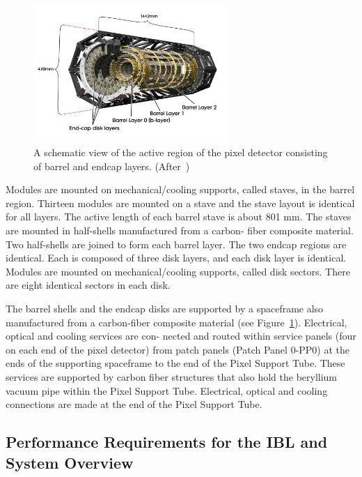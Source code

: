 \begin{figure}[!htpb]
\centering
\includegraphics[width=0.65\textwidth]{pixstruc.png}
\caption{\label{fig:pixstruc} A schematic view of the active region of the pixel detector consisting of barrel and endcap layers. (After~\cite{AtlasPixels})}
\end{figure}

Modules are mounted on mechanical/cooling supports, called staves, in the barrel region. Thirteen 
modules are mounted on a stave and the stave layout is identical for all layers. The active length of 
each barrel stave is about 801 mm. The staves are mounted in half-shells manufactured from a carbon-
fiber composite material. Two half-shells are joined to form each barrel layer.
The two endcap regions are identical. Each is composed of three disk layers, and each disk layer is 
identical. Modules are mounted on mechanical/cooling supports, called disk sectors. There are eight 
identical sectors in each disk.

The barrel shells and the endcap disks are supported by a spaceframe also manufactured from a 
carbon-fiber composite material (see Figure~\ref{fig:pixstruc}). Electrical, optical and cooling services 
are con- nected and routed within service panels (four on each end of the pixel detector) from patch 
panels (Patch Panel 0-PP0) at the ends of the supporting spaceframe to the end of the Pixel Support 
Tube.
These services are supported by carbon fiber structures that also hold the beryllium vacuum pipe within 
the Pixel Support Tube. Electrical, optical and cooling connections are made at the end of the Pixel 
Support Tube.

\subsection{Performance Requirements for the IBL and System Overview}
\label{sec:IBLoverview}

